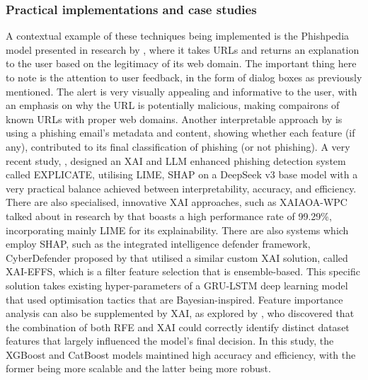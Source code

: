 
\subsubsection*{Practical implementations and case studies}
A contextual example of these techniques being implemented is the Phishpedia model presented in research by \cite{lin2021phishpedia}, where it takes URLs and returns an explanation to the user based on the legitimacy of its web domain. The important thing here to note is the attention to user feedback, in the form of dialog boxes as previously mentioned. The alert is very visually appealing and informative to the user, with an emphasis on why the URL is potentially malicious, making compairons of known URLs with proper web domains. Another interpretable approach by \cite{bravo2010bridging} is using a phishing email's metadata and content, showing whether each feature (if any), contributed to its final classification of phishing (or not phishing). A very recent study, \cite{lim2025explicate}, designed an XAI and LLM enhanced phishing detection system called EXPLICATE, utilising LIME, SHAP on a DeepSeek v3 base model with a very practical balance achieved between interpretability, accuracy, and efficiency. There are also specialised, innovative XAI approaches, such as XAIAOA-WPC talked about in research by \cite{alotaibi2025explainable} that boasts a high performance rate of 99.29\%, incorporating mainly LIME for its explainability. There are also systems which employ SHAP, such as the integrated intelligence defender framework, CyberDefender proposed by \cite{krishnaveni2024cyberdefender} that utilised a similar custom XAI solution, called XAI-EFFS, which is a filter feature selection that is ensemble-based. This specific solution takes existing hyper-parameters of a GRU-LSTM deep learning model that used optimisation tactics that are Bayesian-inspired. Feature importance analysis can also be supplemented by XAI, as explored by \cite{fajar2024enhancing}, who discovered that the combination of both RFE and XAI could correctly identify distinct dataset features that largely influenced the model's final decision. In this study, the XGBoost and CatBoost models maintined high accuracy and efficiency, with the former being more scalable and the latter being more robust.
